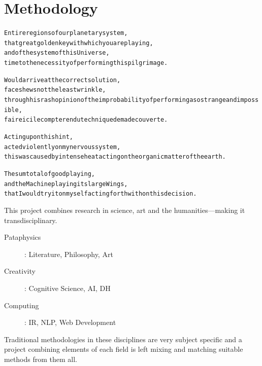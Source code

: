 
\chapter{Methodology}
\label{ch:methodology}

\startcontents[chapters]

\vfill

\begin{alltt}\sffamily
Entire regions of our planetary system,
that great golden key with which you are playing,
and of the system of this Universe,
time to the necessity of performing this pilgrimage.

Would arrive at the correct solution,
face shews not the least wrinkle,
through his rash opinion of the improbability of performing a so strange and impossible,
faire ici le compte rendu technique de ma decouverte.

Acting upon this hint,
acted violently on my nervous system,
this was caused by intense heat acting on the organic matter of the earth.

The sum total of good playing,
and the Machine playing its large Wings,
that I would try it on myself acting forthwith on this decision.
\end{alltt}

\newpage
\minicontents
\spirals



This project combines research in science, art and the humanities---making it transdisciplinary.

\begin{description}
  \item [Pataphysics]: Literature, Philosophy, Art
  \item [Creativity]: Cognitive Science, \ac{AI}, \ac{DH}
  \item [Computing]: \ac{IR}, \ac{NLP}, Web Development
\end{description}


Traditional methodologies in these disciplines are very subject specific and a project combining elements of each field is left mixing and matching suitable methods from them all.

